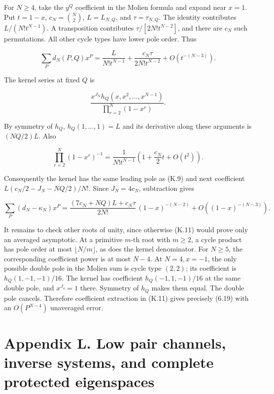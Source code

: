 \documentclass[a4paper,11pt]{article}
\numberwithin{equation}{section}
\begin{document}
For \(N\ge4\), take the \(y^Q\) coefficient in the Molien formula and expand near \(x=1\). Put \(t=1-x\), \(c_N=\binom N2\), \(L=L_{N,Q}\), and \(\tau=\tau_{N,Q}\). The identity contributes \(L/(N!t^{N-1})\). A transposition contributes \(\tau/[2N!t^{N-2}]\), and there are \(c_N\) such permutations. All other cycle types have lower pole order. Thus

\[
\sum_Pd_N(P,Q)x^P
=\frac{L}{N!t^{N-1}}+\frac{c_N\tau}{2N!t^{N-2}}+O(t^{-(N-3)}).
\tag{K.9}
\]

The kernel series at fixed \(Q\) is

\[
\frac{x^{J_N}h_Q(x,x^2,\ldots,x^{N-1})}{\prod_{r=2}^N(1-x^r)}.
\tag{K.10}
\]

By symmetry of \(h_Q\), \(h_Q(1,\ldots,1)=L\) and its derivative along these arguments is \((NQ/2)L\). Also

\[
\prod_{r=2}^N(1-x^r)^{-1}
=\frac1{N!t^{N-1}}\left(1+\frac{c_N}{2}t+O(t^2)\right).
\]

Consequently the kernel has the same leading pole as (K.9) and next coefficient \(L(c_N/2-J_N-NQ/2)/N!\). Since \(J_N=4c_N\), subtraction gives

\[
\sum_P(d_N-\kappa_N)x^P
=\frac{(7c_N+NQ)L+c_N\tau}{2N!}\,(1-x)^{-(N-2)}
+O((1-x)^{-(N-3)}).
\tag{K.11}
\]

It remains to check other roots of unity, since otherwise (K.11) would prove only an averaged asymptotic. At a primitive \(m\)-th root with \(m\ge2\), a cycle product has pole order at most \(\lfloor N/m\rfloor\), as does the kernel denominator. For \(N\ge5\), the corresponding coefficient power is at most \(N-4\). At \(N=4,x=-1\), the only possible double pole in the Molien sum is cycle type \((2,2)\); its coefficient is \(h_Q(1,-1,-1)/16\). The kernel has coefficient \(h_Q(-1,1,-1)/16\) at the same double pole, and \(x^{J_4}=1\) there. Symmetry of \(h_Q\) makes them equal. The double pole cancels. Therefore coefficient extraction in (K.11) gives precisely (6.19) with an \(O(P^{N-4})\) unaveraged error.

\clearpage
\hypertarget{appendix-l.-low-pair-channels-inverse-systems-and-complete-protected-eigenspaces}{%
\section{Appendix L. Low pair channels, inverse systems, and complete protected eigenspaces}\label{appendix-l.-low-pair-channels-inverse-systems-and-complete-protected-eigenspaces}}
\end{document}
